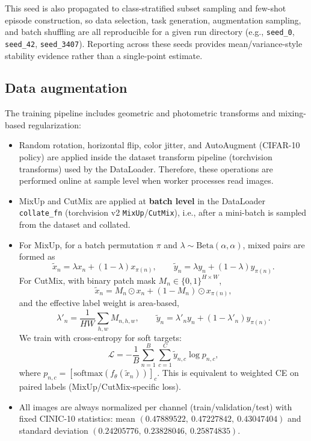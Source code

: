 \documentclass[cameraready]{Interspeech}
\begin{document}
This seed is also propagated to class-stratified subset sampling and few-shot episode construction, so data selection, task generation, augmentation sampling, and batch shuffling are all reproducible for a given run directory (e.g., \texttt{seed\_0}, \texttt{seed\_42}, \texttt{seed\_3407}). Reporting across these seeds provides mean/variance-style stability evidence rather than a single-point estimate.

\subsection{Data augmentation}
The training pipeline includes geometric and photometric transforms and mixing-based regularization:
\begin{itemize}
    \item Random rotation, horizontal flip, color jitter, and AutoAugment (CIFAR-10 policy) \cite{Cubuk_2019_CVPR} are applied inside the dataset transform pipeline (torchvision transforms) used by the DataLoader. Therefore, these operations are performed online at sample level when worker processes read images.
    \item MixUp \cite{zhang2018mixupempiricalriskminimization} and CutMix \cite{Yun_2019_ICCV_cutmix} are applied at \textbf{batch level} in the DataLoader \texttt{collate\_fn} (torchvision v2 \texttt{MixUp}/\texttt{CutMix}), i.e., after a mini-batch is sampled from the dataset and collated.
    \item For MixUp, for a batch permutation $\pi$ and $\lambda \sim \mathrm{Beta}(\alpha,\alpha)$, mixed pairs are formed as
    \[
    \tilde{x}_n = \lambda x_n + (1-\lambda)x_{\pi(n)}, \qquad
    \tilde{y}_n = \lambda y_n + (1-\lambda)y_{\pi(n)}.
    \]
    For CutMix, with binary patch mask $M_n \in \{0,1\}^{H \times W}$,
    \[
    \tilde{x}_n = M_n \odot x_n + (1-M_n) \odot x_{\pi(n)},
    \]
    and the effective label weight is area-based,
    \[
    \lambda'_n = \frac{1}{HW}\sum_{h,w} M_{n,h,w}, \qquad
    \tilde{y}_n = \lambda'_n y_n + (1-\lambda'_n)y_{\pi(n)}.
    \]
    We train with cross-entropy for soft targets:
    \[
    \mathcal{L} = -\frac{1}{B}\sum_{n=1}^{B}\sum_{c=1}^{C}\tilde{y}_{n,c}\log p_{n,c},
    \]
    where $p_{n,c}=[\mathrm{softmax}(f_\theta(\tilde{x}_n))]_c$. This is equivalent to weighted CE on paired labels (MixUp/CutMix-specific loss).
    \item All images are always normalized per channel (train/validation/test) with fixed CINIC-10 statistics: mean $(0.47889522,\ 0.47227842,\ 0.43047404)$ and standard deviation $(0.24205776,\ 0.23828046,\ 0.25874835)$.
\end{itemize}
\end{document}
